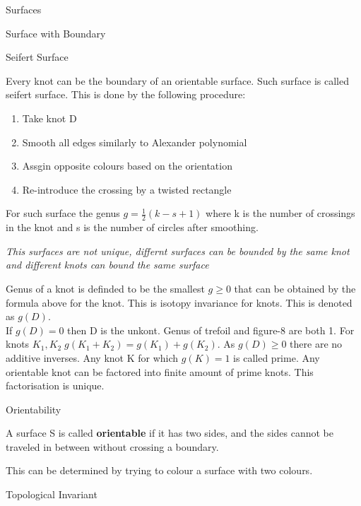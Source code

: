 \documentclass[12pt, letterpaper]{article}
\begin{document}
\begin{section}{Surfaces}
\begin{subsection}{Surface with Boundary}
  \end{subsection}

  \begin{subsection}{Seifert Surface}

    Every knot can be the boundary of an orientable surface. Such surface is
    called seifert surface.
    This is done by the following procedure:
    \begin{enumerate}
      \item Take knot D
      \item Smooth all edges similarly to Alexander polynomial
      \item Assgin opposite colours based on the orientation
      \item Re-introduce the crossing by a twisted rectangle
    \end{enumerate}

    For such surface the genus \(g = \frac{1}{2} (k - s  + 1)\) where k is the
    number of crossings in the knot and s is the number of circles after smoothing.

    \emph{This surfaces are not unique, differnt surfaces can be bounded by the
      same knot and different knots can bound the same surface}

    Genus of a knot is definded to be the smallest \(g \geq 0\) that can be
    obtained by the formula above for the knot. This is isotopy invariance for
    knots. This is denoted as \(g(D)\). \\
    If \(g(D) = 0\) then D is the unkont. Genus of trefoil and figure-8 are both 1.
    For knots \(K_{1}, K_{2} \; g(K_{1} + K_{2}) = g(K_{1}) + g(K_{2})\). As
    \(g(D) \geq 0\) there are no additive inverses. Any knot K for which \(g(K) = 1\)
    is called prime. Any orientable knot can be factored into finite amount of prime
    knots. This factorisation is unique.

  \end{subsection}

  \begin{subsection}{Orientability}

    A surface S is called \textbf{orientable} if it has two sides, and
    the sides cannot be traveled in between without crossing a boundary.

    This can be determined by trying to colour a surface with two colours.

  \end{subsection}

  \begin{subsection}{Topological Invariant}


\end{subsection}
\end{section}
\end{document}
